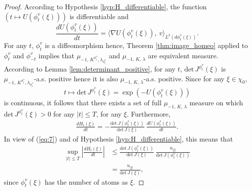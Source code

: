 \documentclass[11pt,a4paper]{amsart}
\begin{document}
\begin{proof}
  According to Hypothesis \ref{hyp:H_differentiable}, the function
  $(t\mapsto U(\phi_t^v(\xi)))$ is differentiable and
  \begin{equation}
    \label{eq:7}   \frac{d U(\phi_t^v(\xi))}{dt}=\langle \nabla U(\phi_t^v (\xi)),\
    v\rangle_{L^2(d\phi_t^v(\xi))} . 
  \end{equation}
  For any $t$, $\phi_t^v$ is a diffeomorphism hence, Theorem
  \ref{thm:image_homeo} applied to $\phi_t^v$ and $\phi_{-t}^v$
  implies that $\mu_{-1,\, K^{\phi_t^v},\lambda_{\phi_t^v}}$ and
  $\mu_{-1,\, K,\, \lambda}$ are equivalent measure. According to
  Lemma \ref{lem:determinant_positive}, for any $t$, ${{\text{det}}}\,
  J^{\phi_t^v}(\xi)$ is $\mu_{-1,\,
    K^{\phi_t^v},\lambda_{\phi_t^v}}$-a.s. positive hence it is also
  $\mu_{-1,\, K,\, \lambda} $-a.s. positive. Since for any
  $\xi\in\chi_0$,
  \begin{equation*}
    t\mapsto {{\text{det}}} \,
    J^{\phi_t^v}(\xi)=\exp(-U(\phi_t^v(\xi)))
  \end{equation*}
  is continuous, it follows that there exists a set of full
  $\mu_{-1,\, K,\, \lambda} $ measure on which ${{\text{det}}}\,
  J^{\phi_t^v}(\xi)>0$ for any $|t|\le T$, for any $\xi.$ Furthermore,
  \begin{align*}
    \frac{d H_t(\xi)}{dt} = -\frac{{{\text{det}}}\, J(\phi_t^v(\xi))}{{{\text{det}}}\,
      J(\xi)}\ \frac{d U(\phi_t^v(\xi))}{dt}.
  \end{align*}
  In view of (\ref{eq:7}) and of Hypothesis
  \ref{hyp:H_differentiable}, this means that
  \begin{align*}
    \sup_{|t|\le T} \left| \frac{d H_t(\xi)}{dt}\right|&\le
    \frac{{{\text{det}}}\, J(\phi_t^v(\xi))}{{{\text{det}}}\,
      J(\xi)}\ \frac{u_{|\xi|}}{{{\text{det}}}\, J(\phi_t^v(\xi))}\\
    &= \frac{ u_{|\xi|}}{{{\text{det}}}\, J(\xi)},
  \end{align*}
  since $\phi_t^v(\xi)$ has the number of atoms as $\xi.$
\end{proof}
\end{document}
